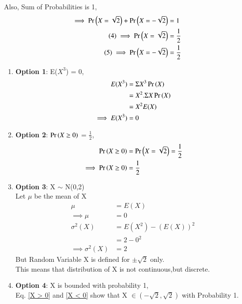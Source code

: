 \documentclass[journal,12pt,twocolumn]{IEEEtran}
\begin{document}
Also, Sum of Probabilities is 1,
\begin{align*}
    \implies \Pr\left(X = \sqrt{2}\right) + \Pr\left(X =-\sqrt{2}\right) &= 1 \\
    \tag{4} \label{X > 0}
    \implies                     \Pr\left(X = \sqrt{2}\right) &= \frac{1}{2} \\
    \tag{5} \label{X < 0}
    \implies                    \Pr\left(X = -\sqrt{2}\right) &= \frac{1}{2}
\end{align*}
\begin{enumerate}
\item \textbf{Option 1}: E($X^3$) = 0,
\begin{align*}
    E(X^3) &= \Sigma X^3 \Pr\left(X\right) \\
           &= X^2 .\Sigma X \Pr\left(X\right) \\
           &= X^2 E(X)\\
\implies E(X^3) &= 0      
\end{align*} 
\begin{center}
\end{center}
\vspace{0.8cm}
\item \textbf{Option 2}: $\Pr\left(X \ge 0\right)$ = $\frac{1}{2}$,
\begin{align*}
    \Pr\left(X\ge 0\right) &= \Pr\left(X = \sqrt{2}\right) = \frac{1}{2} \\
    \implies \Pr\left(X \ge 0\right) &= \frac{1}{2}
\end{align*}
\begin{center}
\end{center}
\vspace{0.1cm}
\item \textbf{Option 3}: X $\sim$ N(0,2) \\
Let $\mu$ be the mean of X
\begin{align*}
            \mu &= E(X) \\
    \tag{6} \label{mu}
   \implies \mu &= 0 \\
      \sigma^2(X) &= E(X^2) - (E(X))^{2} \\
                &= 2 - 0^{2} \\
                \tag{7} 
\implies \sigma^2(X) &= 2
\end{align*}
But Random Variable X is defined for $\pm\sqrt{2}$ only.\\
This means that distribution of X is not continuous,but discrete.
\vspace{0.3cm}
\begin{center}
\end{center}
\vspace{0.3cm}
\item \textbf{Option 4}: X is bounded with probability 1, \\
Eq. \eqref{X > 0} and \eqref{X < 0} show that X $\in ({-\sqrt{2},\sqrt{2}})$ with Probability 1. 
\vspace{0.5cm} \\
\centering {}
\end{enumerate}
\vspace{0.5cm}
\centering {}
\end{document}
